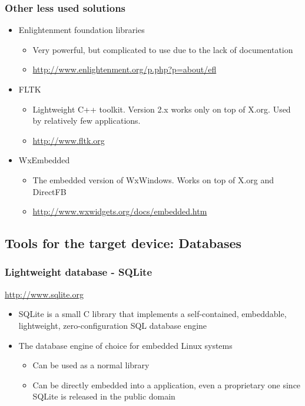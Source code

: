 \begin{frame}
  \frametitle{Other less used solutions}
  \begin{itemize}
  \item Enlightenment foundation libraries
    \begin{itemize}
    \item Very powerful, but complicated to use due to the lack of
      documentation
    \item \url{http://www.enlightenment.org/p.php?p=about/efl}
    \end{itemize}
  \item FLTK
    \begin{itemize}
    \item Lightweight C++ toolkit. Version 2.x works only on top of
      X.org. Used by relatively few applications.
    \item \url{http://www.fltk.org}
    \end{itemize}
  \item WxEmbedded
    \begin{itemize}
    \item The embedded version of WxWindows. Works on top of X.org and DirectFB
    \item \url{http://www.wxwidgets.org/docs/embedded.htm}
    \end{itemize}
  \end{itemize}
\end{frame}

\subsection[Databases]{Tools for the target device: Databases}

\begin{frame}
  \frametitle{Lightweight database - SQLite}
  \url{http://www.sqlite.org}

  \begin{itemize}
  \item SQLite is a small C library that implements a self-contained,
    embeddable, lightweight, zero-configuration SQL database engine
  \item The database engine of choice for embedded Linux systems
    \begin{itemize}
    \item Can be used as a normal library
    \item Can be directly embedded into a application, even a
      proprietary one since SQLite is released in the public domain
    \end{itemize}
  \end{itemize}
\end{frame}

